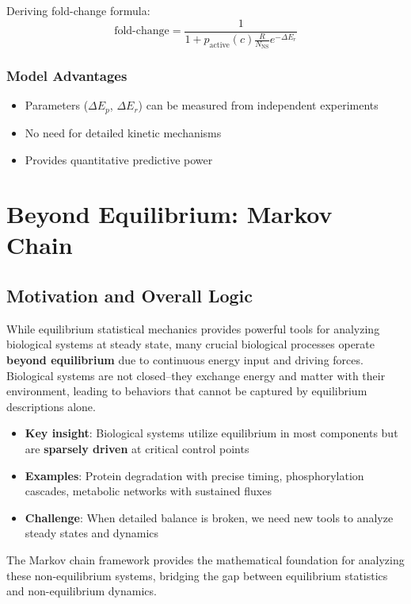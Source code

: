 \documentclass[12pt]{article}
\begin{document}
Deriving fold-change formula:
\begin{equation}
\text{fold-change} = \frac{1}{1 + p_{\text{active}}(c) \frac{R}{N_{\text{NS}}} e^{-\Delta E_r}}
\end{equation}

\subsubsection{Model Advantages}
\begin{itemize}
    \item Parameters ($\Delta E_p$, $\Delta E_r$) can be measured from independent experiments
    \item No need for detailed kinetic mechanisms
    \item Provides quantitative predictive power
\end{itemize}

\section{Beyond Equilibrium: Markov Chain}

\subsection{Motivation and Overall Logic}

While equilibrium statistical mechanics provides powerful tools for analyzing biological systems at steady state, many crucial biological processes operate \textbf{beyond equilibrium} due to continuous energy input and driving forces. Biological systems are not closed--they exchange energy and matter with their environment, leading to behaviors that cannot be captured by equilibrium descriptions alone.

\begin{itemize}
    \item \textbf{Key insight}: Biological systems utilize equilibrium in most components but are \textbf{sparsely driven} at critical control points
    \item \textbf{Examples}: Protein degradation with precise timing, phosphorylation cascades, metabolic networks with sustained fluxes
    \item \textbf{Challenge}: When detailed balance is broken, we need new tools to analyze steady states and dynamics
\end{itemize}

The Markov chain framework provides the mathematical foundation for analyzing these non-equilibrium systems, bridging the gap between equilibrium statistics and non-equilibrium dynamics.
\end{document}
